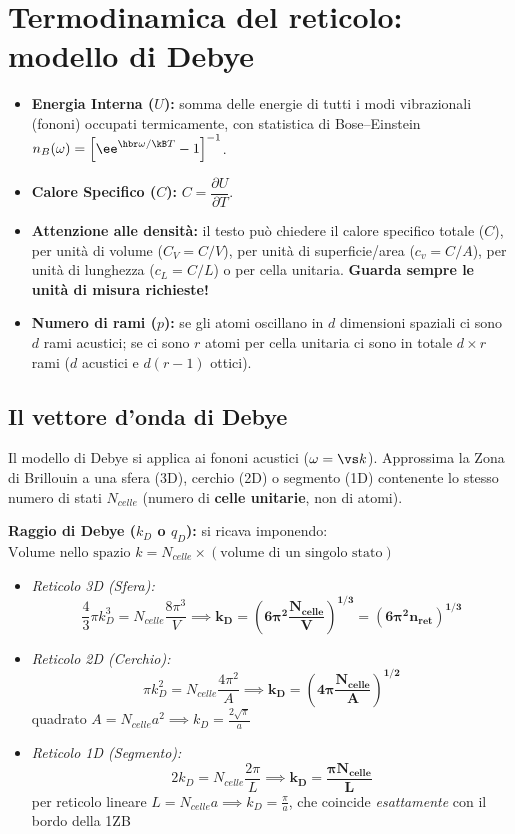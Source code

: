 \newpage

\section{Termodinamica del reticolo: modello di Debye}

\begin{itemize}
    \item \textbf{Energia Interna ($U$):} somma delle energie di tutti i modi vibrazionali (fononi) occupati termicamente, con statistica di Bose--Einstein $n_B(\omega)=\left[\ee^{\hbr\omega/\kB T}-1\right]^{-1}$.
    \item \textbf{Calore Specifico ($C$):} $C = \dfrac{\partial U}{\partial T}$.
    \item \textbf{Attenzione alle densità:} il testo può chiedere il calore specifico totale ($C$), per unità di volume ($C_V = C/V$), per unità di superficie/area ($c_v = C/A$), per unità di lunghezza ($c_L = C/L$) o per cella unitaria. \textbf{Guarda sempre le unità di misura richieste!}
    \item \textbf{Numero di rami ($p$):} se gli atomi oscillano in $d$ dimensioni spaziali ci sono $d$ rami acustici; se ci sono $r$ atomi per cella unitaria ci sono in totale $d\times r$ rami ($d$ acustici e $d(r-1)$ ottici).
\end{itemize}

\subsection{Il vettore d'onda di Debye}
Il modello di Debye si applica ai fononi acustici ($\omega = \vs k$). Approssima la Zona di Brillouin a una sfera (3D), cerchio (2D) o segmento (1D) contenente lo stesso numero di stati $N_{celle}$ (numero di \textbf{celle unitarie}, non di atomi).

\vspace{0.15cm}
\noindent\textbf{Raggio di Debye ($k_D$ o $q_D$):} si ricava imponendo: $ \text{Volume nello spazio } k = N_{celle} \times (\text{volume di un singolo stato})$

\begin{itemize}
    \item \textit{Reticolo 3D (Sfera):}
    \[ \frac{4}{3}\pi k_D^3 = N_{celle} \frac{8\pi^3}{V} \implies \bm{k_D = \left( 6\pi^2 \frac{N_{celle}}{V} \right)^{1/3} = (6\pi^2 n_{ret})^{1/3}} \]

    \item \textit{Reticolo 2D (Cerchio):}
    \[ \pi k_D^2 = N_{celle} \frac{4\pi^2}{A} \implies \bm{k_D = \left( 4\pi \frac{N_{celle}}{A} \right)^{1/2}} \]
    quadrato $A = N_{celle} a^2 \implies k_D = \frac{2\sqrt{\pi}}{a}$

    \item \textit{Reticolo 1D (Segmento):}
    \[ 2 k_D = N_{celle} \frac{2\pi}{L} \implies \bm{k_D = \frac{\pi N_{celle}}{L}} \]
    per reticolo lineare $L = N_{celle} a \implies k_D = \frac{\pi}{a}$, che coincide \emph{esattamente} con il bordo della 1ZB
\end{itemize}

